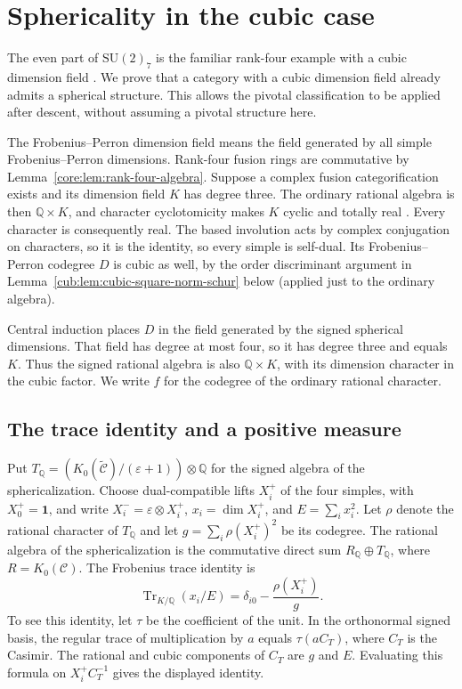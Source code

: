 \documentclass[11pt,a4paper]{article}
\theoremstyle{definition}\newtheorem{definition}[theorem]{Definition}
\theoremstyle{remark}\newtheorem{remark}[theorem]{Remark}
\newcommand{\C}{\mathcal C}
\newcommand{\Q}{\mathbb Q}
\numberwithin{equation}{section}
\begin{document}
\section{Sphericality in the cubic case}\label{sec:cub}

The even part of $\mathrm{SU}(2)_7$ is the familiar rank-four example
with a cubic dimension field \cite[Section~5.3.10]{RSW}.
We prove that a category with a cubic dimension field already admits
a spherical structure. This allows the pivotal classification to be
applied after descent, without assuming a pivotal structure here.

The Frobenius--Perron dimension field means the field generated by
all simple Frobenius--Perron dimensions. Rank-four fusion rings are commutative by
Lemma~\ref{core:lem:rank-four-algebra}. Suppose a complex fusion categorification exists
and its dimension field $K$ has degree three. The ordinary rational algebra is then $\Q\times K$,
and character cyclotomicity makes $K$ cyclic and totally real
\cite[Corollary~8.53]{ENO}. Every character is consequently real.
The based involution acts by complex conjugation on characters, so it
is the identity, so every simple is self-dual.
Its Frobenius--Perron codegree $D$ is cubic as well, by the order
discriminant argument in Lemma~\ref{cub:lem:cubic-square-norm-schur}
below (applied just to the ordinary algebra).

Central induction places $D$ in the field generated by the signed
spherical dimensions. That field has degree at most four, so it has
degree three and equals $K$. Thus the signed rational algebra is also
$\Q\times K$, with its dimension character in the cubic factor.
We write $f$ for the codegree of the ordinary rational character.

\subsection{The trace identity and a positive measure}
Put $T_{\Q}=(K_0(\widetilde{\C})/(\varepsilon+1))\otimes\Q$ for the
signed algebra of the sphericalization. Choose dual-compatible lifts
$X_i^+$ of the four simples, with $X_0^+=\mathbf1$, and write
$X_i^-=\varepsilon\otimes X_i^+$,
$x_i=\dim X_i^+$, and $E=\sum_i x_i^2$.  Let $\rho$ denote the
rational character of $T_{\Q}$ and let
$g=\sum_i\rho(X_i^+)^2$ be its codegree.  The rational algebra of the sphericalization is the commutative direct sum $R_{\Q}\oplus T_{\Q}$, where $R=K_0(\C)$.  The Frobenius trace identity is
\begin{equation}\label{cub:eq:cubic-corrected-frobenius}
 \operatorname{Tr}_{K/\Q}(x_i/E)
       =\delta_{i0}-\frac{\rho(X_i^+)}g.
\end{equation}
To see this identity, let $\tau$ be the coefficient of the unit.
In the orthonormal signed basis, the regular trace of multiplication by
$a$ equals $\tau(a C_T)$, where $C_T$ is the Casimir.  The rational and
cubic components of $C_T$ are $g$ and $E$.  Evaluating this formula on
$X_i^+ C_T^{-1}$ gives the displayed identity.
\end{document}
